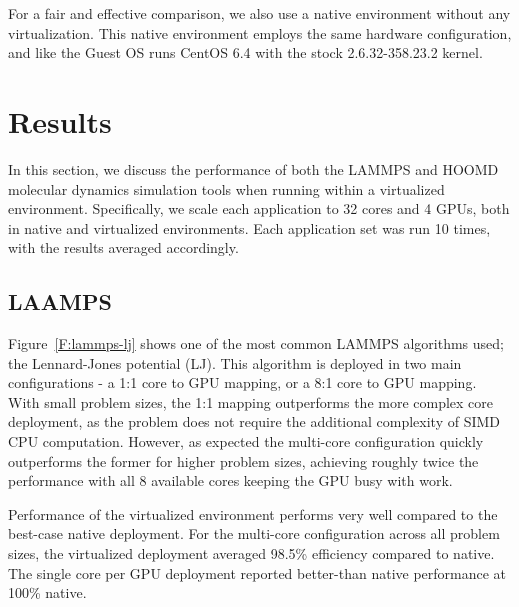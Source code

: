 \documentclass[times,10pt,twocolumn,conference]{IEEEtran}
\begin{document}
For a fair and effective comparison, we also use a native environment without any virtualization. This native environment employs the same hardware configuration, and like the Guest OS runs CentOS 6.4 with the stock 2.6.32-358.23.2 kernel. 


 
\section{Results}

In this section, we discuss the performance of both the LAMMPS and HOOMD molecular dynamics simulation tools when running within a virtualized environment. Specifically, we scale each application to 32 cores and 4 GPUs, both in native and virtualized environments.  Each application set was run 10 times, with the results averaged accordingly. 

\subsection{LAAMPS}


Figure~\ref{F:lammps-lj} shows one of the most common LAMMPS algorithms used; the Lennard-Jones potential (LJ).  This algorithm is deployed in two main configurations - a 1:1 core to GPU mapping, or a 8:1 core to GPU mapping.  With small problem sizes, the 1:1 mapping outperforms the more complex core deployment, as the problem does not require the additional complexity of SIMD CPU computation.  However, as expected the multi-core configuration quickly outperforms the former for higher problem sizes, achieving roughly twice the performance with all 8 available cores keeping the GPU busy with work. 

Performance of the virtualized environment performs very well compared to the best-case native deployment. For the multi-core configuration across all problem sizes, the virtualized deployment averaged 98.5\% efficiency compared to native. The single core per GPU deployment reported better-than native performance at 100\% native. 
\end{document}
